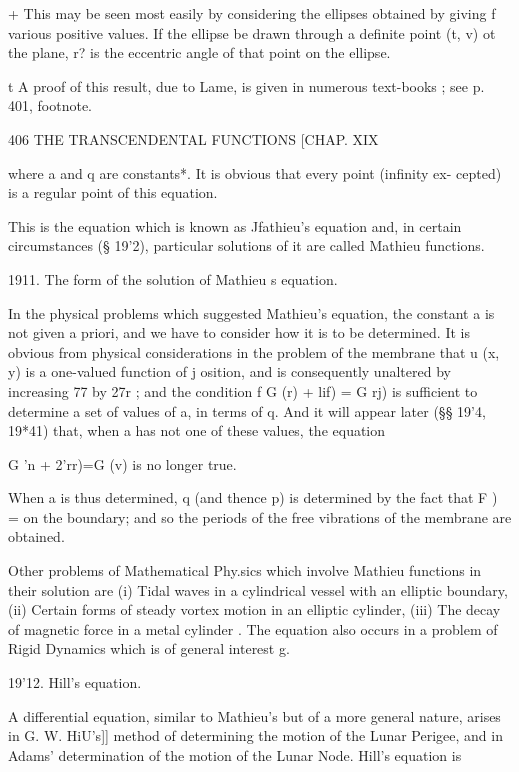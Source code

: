 + This may be seen most easily by considering the ellipses obtained by giving f various 
positive values. If the ellipse be drawn through a definite point (t, v) ot the plane, r? is the 
eccentric angle of that point on the ellipse. 

t A proof of this result, due to Lame, is given in numerous text-books ; see p. 401, footnote. 



406 THE TRANSCENDENTAL FUNCTIONS [CHAP. XIX 

where a and q are constants*. It is obvious that every point (infinity ex- 
cepted) is a regular point of this equation. 

This is the equation which is known as Jfathieu's equation and, in certain 
circumstances (§ 19'2), particular solutions of it are called Mathieu functions. 

1911. The form of the solution of Mathieu  s equation. 

In the physical problems which suggested Mathieu's equation, the constant 
a is not given a priori, and we have to consider how it is to be determined. 
It is obvious from physical considerations in the problem of the membrane 
that u (x, y) is a one-valued function of j osition, and is consequently unaltered 
by increasing 77 by 27r ; and the condition f G (r) + lif) = G  rj) is sufficient to 
determine a set of values of a, in terms of q. And it will appear later (§§ 19'4, 
19*41) that, when a has not one of these values, the equation 

G 'n + 2'rr)=G (v) 
is no longer true. 

When a is thus determined, q (and thence p) is determined by the fact 
that F  ) = on the boundary; and so the periods of the free vibrations of 
the membrane are obtained. 

Other problems of Mathematical Phy.sics which involve Mathieu functions in their 
solution are (i) Tidal waves in a cylindrical vessel with an elliptic boundary, (ii) Certain 
forms of steady vortex motion in an elliptic cylinder, (iii) The decay of magnetic force 
in a metal cylinder . The equation also occurs in a problem of Rigid Dynamics which 
is of general interest g. 

19'12. Hill's equation. 

A differential equation, similar to Mathieu's but of a more general nature, 
arises in G. W. HiU's]] method of determining the motion of the Lunar 
Perigee, and in Adams'  determination of the motion of the Lunar Node. 
Hill's equation is 

